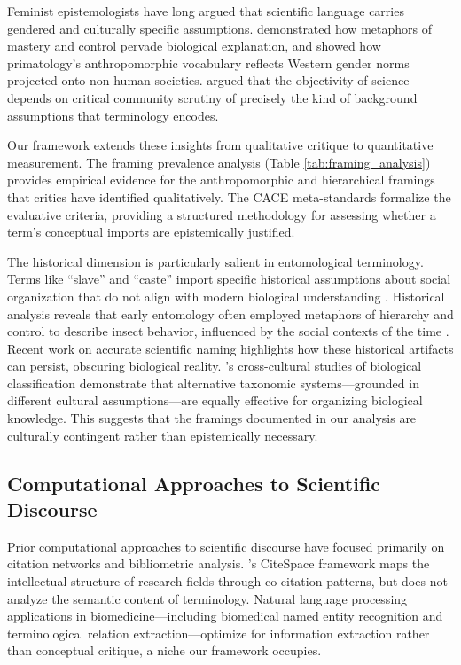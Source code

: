 \documentclass[
]{article}
\numberwithin{equation}{section}
\begin{document}
Feminist epistemologists have long argued that scientific language
carries gendered and culturally specific assumptions.
\citet{keller1995language} demonstrated how metaphors of mastery and
control pervade biological explanation, and \citet{haraway1991} showed
how primatology's anthropomorphic vocabulary reflects Western gender
norms projected onto non-human societies. \citet{longino1990} argued
that the objectivity of science depends on critical community scrutiny
of precisely the kind of background assumptions that terminology
encodes.

Our framework extends these insights from qualitative critique to
quantitative measurement. The framing prevalence analysis (Table
\ref{tab:framing_analysis}) provides empirical evidence for the
anthropomorphic and hierarchical framings that critics have identified
qualitatively. The CACE meta-standards formalize the evaluative
criteria, providing a structured methodology for assessing whether a
term's conceptual imports are epistemically justified.

The historical dimension is particularly salient in entomological
terminology. Terms like ``slave'' and ``caste'' import specific
historical assumptions about social organization that do not align with
modern biological understanding \cite{herbers2006, herbers2007}.
Historical analysis reveals that early entomology often employed
metaphors of hierarchy and control to describe insect behavior,
influenced by the social contexts of the time
\cite{mavhunga2018transient, sleigh2007ants}. Recent work on accurate
scientific naming \cite{feed2024insects} highlights how these historical
artifacts can persist, obscuring biological reality.
\citeauthor{berlin1992}'s \citeyearpar{berlin1992} cross-cultural
studies of biological classification demonstrate that alternative
taxonomic systems---grounded in different cultural assumptions---are
equally effective for organizing biological knowledge. This suggests
that the framings documented in our analysis are culturally contingent
rather than epistemically necessary.

\subsection{Computational Approaches to Scientific
Discourse}\label{computational-approaches-to-scientific-discourse}

Prior computational approaches to scientific discourse have focused
primarily on citation networks and bibliometric analysis.
\citeauthor{chen2006citespace}'s CiteSpace framework
\citeyearpar{chen2006citespace} maps the intellectual structure of
research fields through co-citation patterns, but does not analyze the
semantic content of terminology. Natural language processing
applications in biomedicine---including biomedical named entity
recognition and terminological relation extraction---optimize for
information extraction rather than conceptual critique, a niche our
framework occupies.
\end{document}
